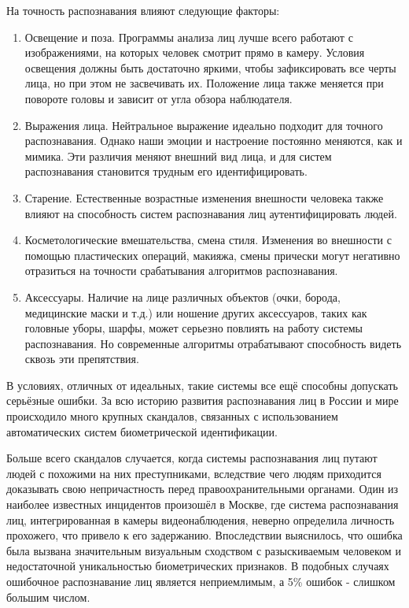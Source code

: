 На точность распознавания влияют следующие факторы:
\begin{enumerate}
	\item Освещение и поза. Программы анализа лиц лучше всего работают с изображениями, на которых человек смотрит прямо в камеру. Условия освещения должны быть достаточно яркими, чтобы зафиксировать все черты лица, но при этом не засвечивать их. Положение лица также меняется при повороте головы и зависит от угла обзора наблюдателя. 
	\item Выражения лица. Нейтральное выражение идеально подходит для точного распознавания. Однако наши эмоции и настроение постоянно меняются, как и мимика. Эти различия меняют внешний вид лица, и для систем распознавания становится трудным его идентифицировать.
	\item Старение. Естественные возрастные изменения внешности человека также влияют на способность систем распознавания лиц аутентифицировать людей.
	\item Косметологические вмешательства, смена стиля.  Изменения во внешности с помощью пластических операций, макияжа, смены прически могут негативно отразиться на точности срабатывания алгоритмов  распознавания.
	\item Аксессуары. Наличие на лице различных объектов (очки, борода, медицинские маски и т.д.) или ношение других аксессуаров, таких как головные уборы, шарфы, может серьезно повлиять на работу системы распознавания. Но современные алгоритмы отрабатывают способность видеть сквозь эти препятствия\cite{abdulaev}.
\end{enumerate}

В условиях, отличных от идеальных, такие системы все ещё способны допускать серьёзные ошибки. За всю историю развития распознавания лиц в России и мире происходило много крупных скандалов, связанных с использованием автоматических систем биометрической идентификации. 

Больше всего скандалов случается, когда системы распознавания лиц путают людей с похожими на них преступниками, вследствие чего людям приходится доказывать свою непричастность перед правоохранительными органами. Один из наиболее известных инцидентов произошёл в Москве, где система распознавания лиц, интегрированная в камеры видеонаблюдения, неверно определила личность прохожего, что привело к его задержанию. Впоследствии выяснилось, что ошибка была вызвана значительным визуальным сходством с разыскиваемым человеком и недостаточной уникальностью биометрических признаков. В подобных случаях ошибочное распознавание лиц является неприемлимым, а 5\% ошибок - слишком большим числом.

	